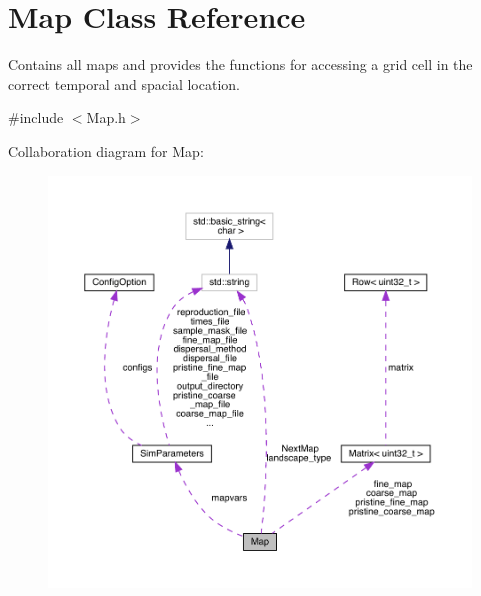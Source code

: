\hypertarget{class_map}{}\section{Map Class Reference}
\label{class_map}


Contains all maps and provides the functions for accessing a grid cell in the correct temporal and spacial location.  




{\ttfamily \#include $<$Map.\+h$>$}



Collaboration diagram for Map\+:\nopagebreak
\begin{figure}[H]
\begin{center}
\leavevmode
\includegraphics[width=350pt]{class_map__coll__graph}
\end{center}
\end{figure}
